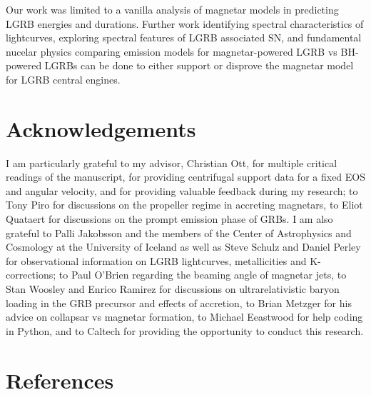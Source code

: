\documentclass{article}
\begin{document}
Our work was limited to a vanilla analysis of magnetar models in predicting LGRB energies and durations. Further work identifying spectral characteristics of lightcurves, exploring spectral features of LGRB associated SN, and fundamental nucelar physics comparing emission models for magnetar-powered LGRB vs BH-powered LGRBs can be done to either support or disprove the magnetar model for LGRB central engines.

\section{Acknowledgements}
I am particularly grateful to my advisor, Christian Ott, for multiple critical readings of the manuscript, for providing centrifugal support data for a fixed EOS and angular velocity, and for providing valuable feedback during my research; to Tony Piro for discussions on the propeller regime in accreting magnetars, to Eliot Quataert for discussions on the prompt emission phase of GRBs. I am also grateful to Palli Jakobsson and the members of the Center of Astrophysics and Cosmology at the University of Iceland as well as Steve Schulz and Daniel Perley for observational information on LGRB lightcurves,  metallicities and K-corrections; to Paul O'Brien regarding the beaming angle of magnetar jets, to Stan Woosley and Enrico Ramirez for discussions on ultrarelativistic baryon loading in the GRB precursor and effects of accretion, to Brian Metzger for his advice on collapsar vs magnetar formation, to Michael Eeastwood for help coding in Python, and to Caltech for providing the opportunity to conduct this research.
\newpage
\clearpage
\renewcommand*{\refname}{}
\section{References}


\end{document}

